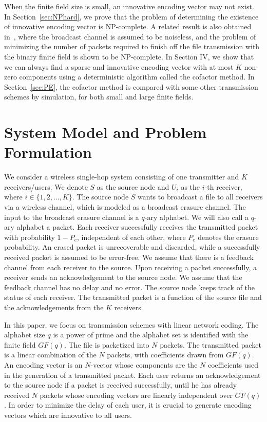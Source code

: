\documentclass[letterpaper,conference,10pt]{IEEEtran}
\begin{document}
When the finite field size is small, an innovative encoding vector may not exist. In Section~\ref{sec:NPhard}, we prove that the problem of determining the existence of innovative encoding vector is NP-complete. A related result is also obtained in~\cite{ERCS07}, where the broadcast channel is assumed to be noiseless, and the problem of minimizing the number of packets required to finish off the file transmission with the binary finite field is shown to be NP-complete. In Section IV, we show that we can always find a sparse and innovative encoding vector with at most $K$ non-zero components using a deterministic algorithm called the cofactor method. In Section~\ref{sec:PE}, the cofactor method is compared with some other transmission schemes by simulation, for both small and large finite fields.




\section{System Model and Problem Formulation}
We consider a wireless single-hop system consisting of one transmitter and $K$ receivers/users. We denote $S$ as the source node and $U_i$ as the $i$-th receiver, where $i \in \{1,2,\ldots,K\}$.
The source node $S$ wants to broadcast a file to all receivers via a wireless channel, which is modeled as a broadcast erasure channel.
The input to the broadcast erasure channel is a $q$-ary alphabet. We will also call a $q$-ary alphabet a packet.
Each receiver successfully receives the transmitted packet with probability $1-P_e$, independent of each other, where $P_e$ denotes the erasure probability. An erased packet is unrecoverable and discarded, while a successfully received packet is assumed to be error-free. We assume that there is a feedback channel from each receiver to the source. Upon receiving a packet successfully, a receiver sends an acknowledgement to the source node. We assume that the feedback channel has no delay and no error. The source node keeps track of the status of each receiver. The transmitted packet is a function of the source file and the acknowledgements from the $K$ receivers.

In this paper, we focus on transmission schemes with linear network coding. The alphabet size $q$ is a power of prime and the alphabet set is identified with the finite field $GF(q)$.
The file is packetized into $N$ packets. The transmitted packet is a linear combination of the $N$ packets, with coefficients drawn from $GF(q)$. An encoding vector is an $N$-vector whose components are the $N$ coefficients used in the generation of a transmitted packet. Each user returns an acknowledgement to the source node if a packet is received successfully, until he has already received $N$ packets whose encoding vectors are linearly independent over $GF(q)$. In order to minimize the delay of each user, it is crucial to generate encoding vectors which are innovative to all users.
\end{document}
